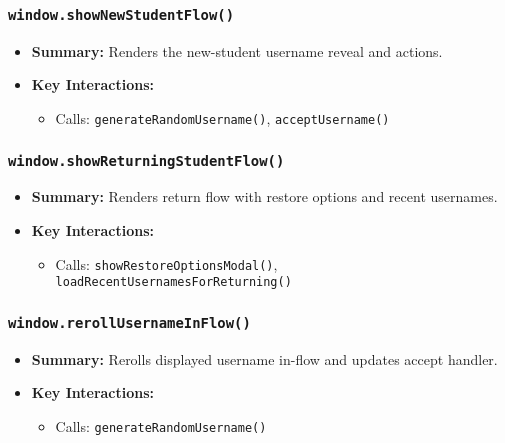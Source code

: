 \documentclass[11pt,letterpaper]{article}
\begin{document}
\subsubsection{\texttt{window.showNewStudentFlow()}}
\begin{itemize}
    \item \textbf{Summary:} Renders the new-student username reveal and actions.
    \item \textbf{Key Interactions:}
    \begin{itemize}
        \item Calls: \texttt{generateRandomUsername()}, \texttt{acceptUsername()}
    \end{itemize}
\end{itemize}

\subsubsection{\texttt{window.showReturningStudentFlow()}}
\begin{itemize}
    \item \textbf{Summary:} Renders return flow with restore options and recent usernames.
    \item \textbf{Key Interactions:}
    \begin{itemize}
        \item Calls: \texttt{showRestoreOptionsModal()}, \texttt{loadRecentUsernamesForReturning()}
    \end{itemize}
\end{itemize}

\subsubsection{\texttt{window.rerollUsernameInFlow()}}
\begin{itemize}
    \item \textbf{Summary:} Rerolls displayed username in-flow and updates accept handler.
    \item \textbf{Key Interactions:}
    \begin{itemize}
        \item Calls: \texttt{generateRandomUsername()}
    \end{itemize}
\end{itemize}
\end{document}
